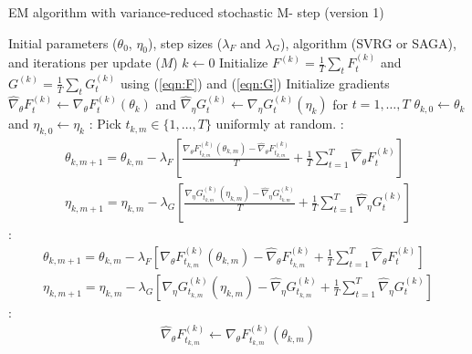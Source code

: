 \begin{algorithm}
\caption{EM algorithm with variance-reduced stochastic M- step (version 1)}\label{alg:EM-SO}
\begin{algorithmic}[1]
\Require Initial parameters ($\theta_{0}$, $\eta_{0}$), step sizes ($\lambda_F$ and $\lambda_G$), algorithm (SVRG or SAGA), and iterations per update ($M$)
%
\State $k \gets 0$
%
\State Initialize $F^{(k)} = \frac{1}{T} \sum_t F_t^{(k)}$ and $G^{(k)} = \frac{1}{T} \sum_t G_t^{(k)}$ using (\ref{eqn:F}) and (\ref{eqn:G})
%
\vspace{8pt}
%
\State Initialize gradients $\widehat \nabla_\theta F_t^{(k)} \gets \nabla_\theta F_t^{(k)} (\theta_k)$ and $\widehat \nabla_\eta G_t^{(k)} \gets \nabla_\eta G_t^{(k)} (\eta_k)$ for $t = 1,\ldots,T$
%
\State $\theta_{k,0} \gets \theta_k$ and $\eta_{k,0} \gets \eta_k$
%
:
    \State Pick $t_{k,m} \in \{1,\ldots,T\}$ uniformly at random.
    :
        \begin{gather}
            \theta_{k,m+1} = \theta_{k,m} - \lambda_F \left[\frac{\nabla_\theta F_{t_{k,m}}^{(k)}(\theta_{k,m}) - \widehat \nabla_\theta F_{t_{k,m}}^{(k)}}{T} + \frac{1}{T} \sum_{t=1}^T \widehat \nabla_\theta F^{(k)}_{t} \right] \\
            \eta_{k,m+1} = \eta_{k,m} - \lambda_G \left[\frac{\nabla_\eta G_{t_{k,m}}^{(k)}(\eta_{k,m}) - \widehat \nabla_\eta G_{t_{k,m}}^{(k)}}{T} + \frac{1}{T} \sum_{t=1}^T \widehat \nabla_\eta G^{(k)}_{t} \right]
        \end{gather}
    :
        \begin{gather}
            \theta_{k,m+1} = \theta_{k,m} - \lambda_F \left[\nabla_\theta F_{t_{k,m}}^{(k)}(\theta_{k,m}) - \widehat \nabla_\theta F_{t_{k,m}}^{(k)} + \frac{1}{T} \sum_{t=1}^T \widehat \nabla_\theta F^{(k)}_{t} \right] \\
            \eta_{k,m+1} = \eta_{k,m} - \lambda_G \left[\nabla_\eta G_{t_{k,m}}^{(k)}(\eta_{k,m}) - \widehat \nabla_\eta G_{t_{k,m}}^{(k)} + \frac{1}{T} \sum_{t=1}^T \widehat \nabla_\eta G^{(k)}_{t} \right]
        \end{gather}
    \EndIf
    :
        \begin{gather}
            \widehat \nabla_\theta F_{t_{k,m}}^{(k)} \gets \nabla_\theta F_{t_{k,m}}^{(k)}(\theta_{k,m}) \\

\end{gather}
\end{algorithmic}
\end{algorithm}
